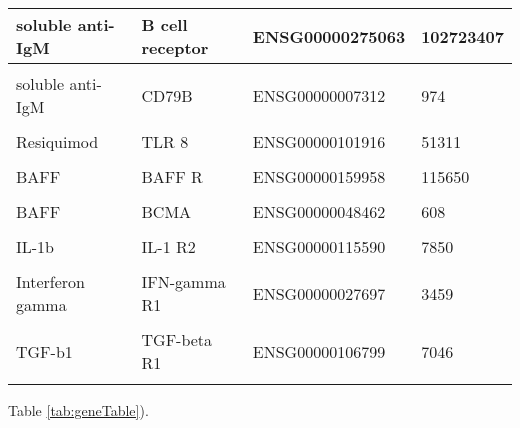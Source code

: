 \documentclass[11pt, a4paper, twosided]{book}
\begin{document}
\begin{table}
\begin{tabular}{l|l|l|l}
\hline
soluble anti-IgM & B cell receptor & ENSG00000275063 & 102723407\\
\hline
\cellcolor[HTML]{E2E868}{soluble anti-IgM} & \cellcolor[HTML]{E2E868}{CD79A} & \cellcolor[HTML]{E2E868}{ENSG00000105369} & \cellcolor[HTML]{E2E868}{973}\\
\hline
soluble anti-IgM & CD79B & ENSG00000007312 & 974\\
\hline
\cellcolor[HTML]{E2E868}{Resiquimod} & \cellcolor[HTML]{E2E868}{TLR 7} & \cellcolor[HTML]{E2E868}{ENSG00000196664} & \cellcolor[HTML]{E2E868}{51284 }\\
\hline
Resiquimod & TLR 8 & ENSG00000101916 & 51311\\
\hline
\cellcolor[HTML]{E2E868}{CpG ODN} & \cellcolor[HTML]{E2E868}{TLR9} & \cellcolor[HTML]{E2E868}{ENSG00000239732} & \cellcolor[HTML]{E2E868}{54106}\\
\hline
BAFF & BAFF R & ENSG00000159958 & 115650\\
\hline
\cellcolor[HTML]{E2E868}{BAFF} & \cellcolor[HTML]{E2E868}{TACI} & \cellcolor[HTML]{E2E868}{ENSG00000240505} & \cellcolor[HTML]{E2E868}{23495}\\
\hline
BAFF & BCMA & ENSG00000048462 & 608\\
\hline
\cellcolor[HTML]{E2E868}{IL-1b} & \cellcolor[HTML]{E2E868}{IL-1 R1} & \cellcolor[HTML]{E2E868}{ENSG00000115594} & \cellcolor[HTML]{E2E868}{3554}\\
\hline
IL-1b & IL-1 R2 & ENSG00000115590 & 7850\\
\hline
\cellcolor[HTML]{E2E868}{sCD40L} & \cellcolor[HTML]{E2E868}{CD40} & \cellcolor[HTML]{E2E868}{ENSG00000101017} & \cellcolor[HTML]{E2E868}{958}\\
\hline
Interferon gamma & IFN-gamma R1 & ENSG00000027697 & 3459\\
\hline
\cellcolor[HTML]{E2E868}{Interferon gamma} & \cellcolor[HTML]{E2E868}{IFN-gamma R2} & \cellcolor[HTML]{E2E868}{ENSG00000159128} & \cellcolor[HTML]{E2E868}{3460}\\
\hline
TGF-b1 & TGF-beta R1 & ENSG00000106799 & 7046\\
\hline
\cellcolor[HTML]{E2E868}{TGF-b1} & \cellcolor[HTML]{E2E868}{TGF-beta R2} & \cellcolor[HTML]{E2E868}{ENSG00000163513} & \cellcolor[HTML]{E2E868}{7048}\\
\hline
\end{tabular}
\endgroup{}
\end{table}
Table \ref{tab:geneTable}).
\end{document}

